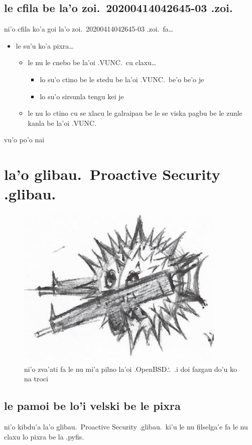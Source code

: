 \documentclass{report}
\newcommand\sds{\spacefactor\sfcode`.\ \space}
\begin{document}
\section{le cfila be la'o zoi.\ 20200414042645-03 .zoi.}
ni'o cfila ko'a goi la'o zoi.\ 20200414042645-03 .zoi.\ fa\ldots
\begin{itemize}
	\item le su'u ko'a pixra\ldots
	\begin{itemize}
		\item le nu le cnebo be la'oi .VUNC.\ cu claxu\ldots
		\begin{itemize}
			\item lo su'o ctino be le stedu be la'oi .VUNC.\ be'o be'o je
			\item lo su'o sirsunla tengu kei je
		\end{itemize}
		\item le nu lo ctino cu se xlacu le galraipau be le se viska pagbu be le zunle kanla be la'oi .VUNC.
	\end{itemize}
\end{itemize}
vu'o po'o nai

\chapter{la'o glibau.\ Proactive Security .glibau.}
\begin{figure}[ht]
	\centering
	\includegraphics[width=10cm]{proactivesecurity/proactivesecurity.png}
	\caption[center]{ni'o zva'ati fa le nu mi'a pilno la'oi .OpenBSD.\sds  .i doi fazgau do'u ko na troci}
\end{figure}
\section{le pamoi be lo'i velski be le pixra}
ni'o kibdu'a la'o glibau.\ Proactive Security .glibau.\ ki'u le nu filselga'e fa le nu claxu lo pixra be la .pyfis.
\end{document}
